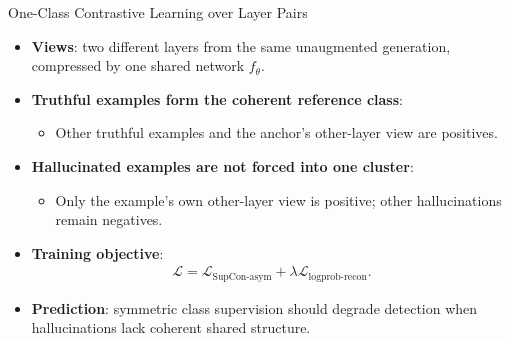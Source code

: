 \documentclass[aspectratio=1610]{beamer}
\begin{document}
\begin{frame}{One-Class Contrastive Learning over Layer Pairs}
\begin{itemize}
  \item \textbf{Views}: two different layers from the same unaugmented generation, compressed by one shared network $f_\theta$.
  \item \textbf{Truthful examples form the coherent reference class}:
  \begin{itemize}
    \item Other truthful examples and the anchor's other-layer view are positives.
  \end{itemize}
  \item \textbf{Hallucinated examples are not forced into one cluster}:
  \begin{itemize}
    \item Only the example's own other-layer view is positive; other hallucinations remain negatives.
  \end{itemize}
  \item \textbf{Training objective}:
  \begin{align*}
    \mathcal{L}=\mathcal{L}_{\mathrm{SupCon\text{-}asym}}
      +\lambda\mathcal{L}_{\mathrm{logprob\text{-}recon}}.
  \end{align*}
  \item \textbf{Prediction}: symmetric class supervision should degrade detection when hallucinations lack coherent shared structure.
\end{itemize}
\end{frame}
\end{document}
